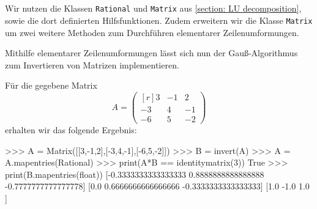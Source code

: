 \section{}

Wir nutzen die Klassen \texttt{Rational} und \texttt{Matrix} aus \ref{section: LU decomposition}, sowie die dort definierten Hilfsfunktionen.
Zudem erweitern wir die Klasse \texttt{Matrix} um zwei weitere Methoden zum Durchführen elementarer Zeilenumformungen.



Mithilfe elementarer Zeilenumformungen lässt sich nun der Gauß-Algorithmus zum Invertieren von Matrizen implementieren.



Für die gegebene Matrix
\[
  A
  = \begin{pmatrix*}[r]
       3  & -1  &  2  \\
      -3  &  4  & -1  \\
      -6  &  5  & -2
    \end{pmatrix*}
\]
erhalten wir das folgende Ergebnis:
\begin{consoleoutput}
>>> A = Matrix([[3,-1,2],[-3,4,-1],[-6,5,-2]])
>>> B = invert(A)
>>> A = A.mapentries(Rational)
>>> print(A*B == identitymatrix(3))
True
>>> print(B.mapentries(float))
[-0.3333333333333333 0.8888888888888888 -0.7777777777777778]
[0.0                 0.6666666666666666 -0.3333333333333333]
[1.0                 -1.0               1.0                ]
\end{consoleoutput}
